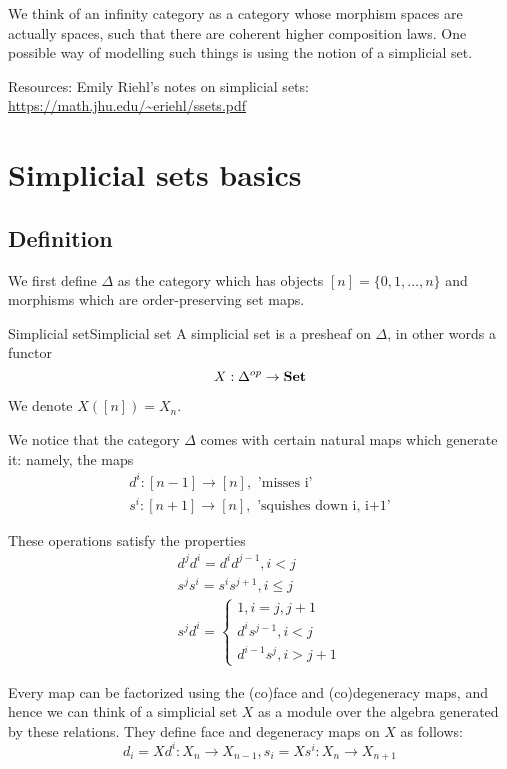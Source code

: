 We think of an infinity category as a category whose morphism spaces are actually spaces, such that there are coherent higher composition laws. One possible way of modelling such things is using the notion of a simplicial set.

Resources: Emily Riehl's notes on simplicial sets: \url{https://math.jhu.edu/~eriehl/ssets.pdf}

\section{Simplicial sets basics}

\subsection{Definition}

We first define $\Delta$ as the category which has objects $[n]=\{0,1,\dots, n\}$ and morphisms which are order-preserving set maps. 

\begin{definition}{Simplicial set}{Simplicial set}
    A simplicial set is a presheaf on $\Delta$, in other words a functor $$X:\Delta^{op}\rightarrow \operatorname{\mathbf{Set}}$$
\end{definition}

We denote $X([n])=X_n$. 

We notice that the category $\Delta$ comes with certain natural maps which generate it: namely, the maps $$\begin{gathered}
    d^i:[n-1]\rightarrow [n], \text{ 'misses i' }\\
    s^i:[n+1]\rightarrow [n], \text{ 'squishes down i, i+1'}
\end{gathered}$$

These operations satisfy the properties $$\begin{gathered}
    d^jd^i = d^id^{j-1}, i<j\\
    s^js^i=s^is^{j+1}, i\leq j\\
    s^jd^i = \begin{cases}
        1, i=j,j+1\\
        d^is^{j-1}, i<j\\
        d^{i-1}s^j, i>j+1
    \end{cases}
\end{gathered}$$

Every map can be factorized using the (co)face and (co)degeneracy maps, and hence we can think of a simplicial set $X$ as a module over the algebra generated by these relations. They define face and degeneracy maps on $X$ as follows: $$d_i = Xd^i:X_n \rightarrow X_{n-1}, s_i = Xs^i:X_n \rightarrow X_{n+1}$$

